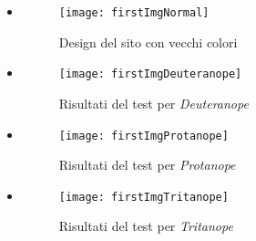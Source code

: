 \begin{itemize}

    \item[]
        \begin{figure}[H]

            \centering
            \texttt{[image: firstImgNormal]}
            \caption{Design del sito con vecchi colori}
        \end{figure}

    \item[]
        \begin{figure}[H]

            \centering
            \texttt{[image: firstImgDeuteranope]}
            \caption{Risultati del test per \textit{Deuteranope}}
        \end{figure}

    \item[]
        \begin{figure}[H]

            \centering
            \texttt{[image: firstImgProtanope]}
            \caption{Risultati del test per \textit{Protanope}}
        \end{figure}

    \item[]
        \begin{figure}[H]

            \centering
            \texttt{[image: firstImgTritanope]}
            \caption{Risultati del test per \textit{Tritanope}}
        \end{figure}

\end{itemize}

